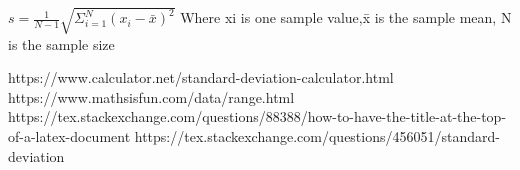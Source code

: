 \documentclass{article}
\begin{document}
\begin{titlepage}
\newline
\begin{math}
s= \frac{1}{N-1}\sqrt{\Sigma_{i=1}^{N}(x_{i}-\bar{x})^2}
\end{math}
Where xi is one sample value,x̄ is the sample mean, N is the sample size


https://www.calculator.net/standard-deviation-calculator.html\newline
https://www.mathsisfun.com/data/range.html\newline
https://tex.stackexchange.com/questions/88388/how-to-have-the-title-at-the-top-of-a-latex-document\newline
https://tex.stackexchange.com/questions/456051/standard-deviation
\end{titlepage}
\end{document}
